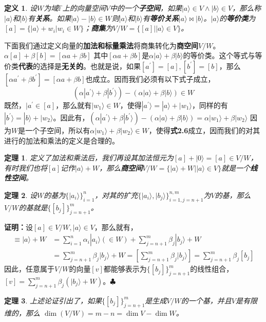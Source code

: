 \documentclass[mathserif,hyperref,UTF8,openany,b5paper]{ctexbook}
\newtheorem{defn}{定义}[section]
\newtheorem{thm}{定理}[section]
\begin{document}
\begin{defn}
设$W$为域$\mathbb{F}$上的向量空间$V$中的一个\textbf{子空间}，如果$|a\rangle \in V \land |b\rangle \in V$，那么称$|a\rangle$和$|b\rangle$有\textbf{关系}。如果$|a\rangle - |b\rangle \in W$则$|a\rangle$和$|b\rangle$有\textbf{等价关系}$|a\rangle \bowtie |b\rangle$。$|a\rangle$的\textbf{等价类}为$[a]=\{|a\rangle+w_i|w_i\in W\}$；\textbf{商集}为$V/W=\{[a]||a\rangle \in V\}$。
\end{defn}
下面我们通过定义向量的\textbf{加法和标量乘法}将商集转化为\textbf{商空间}$V/W$。$\alpha[a]+\beta[b]=[\alpha a+\beta b]$
其中$[\alpha a+\beta b]$是$\alpha |a\rangle+\beta |b\rangle$的等价类。这个等式与等价类\textbf{代表}的选择是\textbf{无关的}。也就是说，如果$[a^{'}]=[a],[b^{'}]=[b]$，那么$[\alpha a^{'} + \beta b^{'}]=[\alpha a + \beta b]$也成立。因而我们必须有以下式子成立，
\begin{equation}
    (\alpha |a^{'}\rangle+\beta |b^{'}\rangle) - (\alpha |a\rangle+\beta |b\rangle)\in W
\end{equation}既然，$|a^{'}\in [a]$，那么就有$|w_1\rangle \in W$，使得$|a^{'}\rangle= |a\rangle + |w_1\rangle$，同样的有$|b^{'}\rangle= |b\rangle + |w_2\rangle$。因此有，$(\alpha |a^{'}\rangle+\beta |b^{'}\rangle) - (\alpha |a\rangle+\beta |b\rangle) = \alpha|w_1\rangle + \beta|w_2\rangle$
因为$W$是一个子空间，所以有$\alpha|w_1\rangle + \beta|w_2\rangle \in W$，使得\textbf{式2.6}成立，因而我们的对其进行的加法和乘法的定义是合理的。
\begin{thm}
定义了加法和乘法后，我们再设其加法恒元为$[a]+|0\rangle = [a]\in V/W$，有时我们也将$[a]$记作$|a\rangle + W$，那么\textbf{商空间}$V/W=\{|a\rangle + W||a\rangle \in V\}$就是一个\textbf{线性空间}。
\end{thm}
\begin{thm}
设$W$的基为$\{|a_i\rangle\}^n_{i=1}$，对其的扩充$\{|a_i\rangle,|b_j\rangle\}^{n,m}_{i=1,j=n+1}$为$V$的基，那么$V/W$的基就是$\{[b_j]\}^m_{j=n+1}$。
\end{thm}
\textbf{证明：}设$[a]\in V/W,|a\rangle \in V$，那么就有，
\begin{align}
[a]\equiv|a\rangle+W &= \sum_{i=1}^{n} \alpha_i|a_i\rangle (\in W) + \sum_{j=n+1}^m \beta_j|b_j\rangle + W\\
&=\sum_{j=n+1}^m  \beta_j|b_j\rangle + W = [\sum_{j=n+1}^m  \beta_j|b_j\rangle] = \sum_{j=n+1}^m  \beta_j[b_j]
\end{align}
因此，任意属于$V/W$的向量$[v]$都能够表示为$\{[b_j]\}_{j=n+1}^m $的线性组合，$[v] = \sum_{j=n+1}^m  \beta_j (|b_j\rangle + W)$。$\clubsuit$
\begin{thm}
上述论证引出了，如果$\{[b_j]\}_{j=n+1}^m $是生成$V/W$的一个基，并且$V$是有限维的，那么 $\dim (V/W) = m-n = \dim V - \dim W$。
\end{thm}
\end{document}
